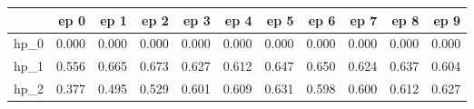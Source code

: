 \begin{tabular}{lrrrrrrrrrr}
\toprule
{} &   ep 0 &   ep 1 &   ep 2 &   ep 3 &   ep 4 &   ep 5 &   ep 6 &   ep 7 &   ep 8 &   ep 9 \\
\midrule
hp\_0 &  0.000 &  0.000 &  0.000 &  0.000 &  0.000 &  0.000 &  0.000 &  0.000 &  0.000 &  0.000 \\
hp\_1 &  0.556 &  0.665 &  0.673 &  0.627 &  0.612 &  0.647 &  0.650 &  0.624 &  0.637 &  0.604 \\
hp\_2 &  0.377 &  0.495 &  0.529 &  0.601 &  0.609 &  0.631 &  0.598 &  0.600 &  0.612 &  0.627 \\
\bottomrule
\end{tabular}
